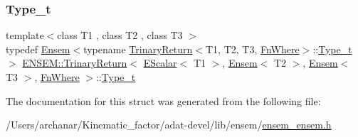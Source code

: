 \subsubsection{\texorpdfstring{Type\_t}{Type\_t}\hspace{0.1cm}{\footnotesize\ttfamily [3/3]}}
{\footnotesize\ttfamily template$<$class T1 , class T2 , class T3 $>$ \\
typedef \mbox{\hyperlink{classENSEM_1_1Ensem}{Ensem}}$<$typename \mbox{\hyperlink{structENSEM_1_1TrinaryReturn}{Trinary\+Return}}$<$T1, T2, T3, \mbox{\hyperlink{structENSEM_1_1FnWhere}{Fn\+Where}}$>$\+::\mbox{\hyperlink{structENSEM_1_1TrinaryReturn_3_01EScalar_3_01T1_01_4_00_01Ensem_3_01T2_01_4_00_01Ensem_3_01T3_01_4_00_01FnWhere_01_4_a2b7715b3629c4779ca69a18ca98336e9}{Type\+\_\+t}}$>$ \mbox{\hyperlink{structENSEM_1_1TrinaryReturn}{E\+N\+S\+E\+M\+::\+Trinary\+Return}}$<$ \mbox{\hyperlink{classENSEM_1_1EScalar}{E\+Scalar}}$<$ T1 $>$, \mbox{\hyperlink{classENSEM_1_1Ensem}{Ensem}}$<$ T2 $>$, \mbox{\hyperlink{classENSEM_1_1Ensem}{Ensem}}$<$ T3 $>$, \mbox{\hyperlink{structENSEM_1_1FnWhere}{Fn\+Where}} $>$\+::\mbox{\hyperlink{structENSEM_1_1TrinaryReturn_3_01EScalar_3_01T1_01_4_00_01Ensem_3_01T2_01_4_00_01Ensem_3_01T3_01_4_00_01FnWhere_01_4_a2b7715b3629c4779ca69a18ca98336e9}{Type\+\_\+t}}}



The documentation for this struct was generated from the following file\+:\begin{DoxyCompactItemize}
\item 
/\+Users/archanar/\+Kinematic\+\_\+factor/adat-\/devel/lib/ensem/\mbox{\hyperlink{adat-devel_2lib_2ensem_2ensem__ensem_8h}{ensem\+\_\+ensem.\+h}}\end{DoxyCompactItemize}
